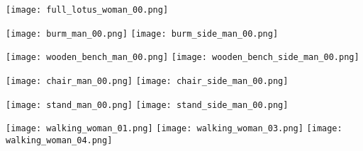 
{\centering

\vspace*{2\onelineskip}
\texttt{[image: full\_lotus\_woman\_00.png]}

\newpage

\begin{minipage}[t][\textheight][t]{80mm}
\setlength\parindent{0pt}
\texttt{[image: burm\_man\_00.png]}
\hfill
\texttt{[image: burm\_side\_man\_00.png]}

\vfill

\texttt{[image: wooden\_bench\_man\_00.png]}
\hfill
\texttt{[image: wooden\_bench\_side\_man\_00.png]}
\end{minipage}

\newpage

\begin{minipage}[t][\textheight][t]{60mm}
\setlength\parindent{0pt}
\texttt{[image: chair\_man\_00.png]}
\hfill
\texttt{[image: chair\_side\_man\_00.png]}

\vfill

\hspace*{-2mm}
\texttt{[image: stand\_man\_00.png]}
\hfill
\texttt{[image: stand\_side\_man\_00.png]}
\hspace*{10mm}
\end{minipage}

\newpage

\mbox{}
\vfill

\texttt{[image: walking\_woman\_01.png]}
\hfill
\texttt{[image: walking\_woman\_03.png]}
\hfill
\texttt{[image: walking\_woman\_04.png]}

\vfill

}

\newpage

